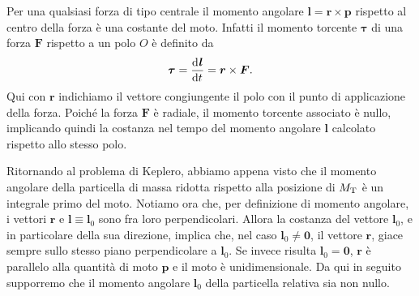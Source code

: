 Per una qualsiasi forza di tipo centrale il momento angolare $\bm{l} = \bm{r}
\times \bm{p}$ rispetto al centro della forza è una costante del moto. Infatti
il momento torcente $\bm{\tau}$ di una forza $\bm{F}$ rispetto a un polo $O$ è
definito da
\begin{equation}
  \bm{\tau}= \frac{{\mathop{}\!\mathrm{d}^{}}\bm{l}}{\mathop{}\!\mathrm{d} {t}^{}} = \bm{r}\times\bm{F}.
\end{equation}
Qui con $\bm{r}$ indichiamo il vettore congiungente il polo con il punto di
applicazione della forza. Poiché la forza $\bm{F}$ è radiale, il momento
torcente associato è nullo, implicando quindi la costanza nel tempo del momento
angolare $\bm{l}$ calcolato rispetto allo stesso polo.

Ritornando al problema di Keplero, abbiamo appena visto che il momento angolare
della particella di massa ridotta rispetto alla posizione di $M_\textup{T}$ è un
integrale primo del moto. Notiamo ora che, per definizione di momento angolare,
i vettori $\bm{r}$ e $\bm{l}\equiv\bm{l}_0$ sono fra loro perpendicolari. Allora
la costanza del vettore $\bm{l}_0$, e in particolare della sua direzione,
implica che, nel caso $\bm{l}_0\neq\bm{0}$, il vettore $\bm{r}$, giace sempre
sullo stesso piano perpendicolare a $\bm{l}_0$. Se invece risulta
$\bm{l}_0=\bm{0}$, $\bm{r}$ è parallelo alla quantità di moto $\bm{p}$ e il moto
è unidimensionale. Da qui in seguito supporremo che il momento angolare
$\bm{l}_0$ della particella relativa sia non nullo.

